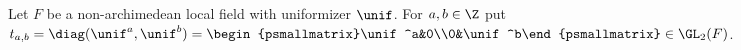Let $F$ be a non-archimedean local field with uniformizer $\unif$. For $a,b\in\Z$ put
$t_{a,b}=\diag(\unif^a,\unif^b)=\begin{psmallmatrix}\unif^a&0\\0&\unif^b\end{psmallmatrix}\in\GL_2(F)$.
